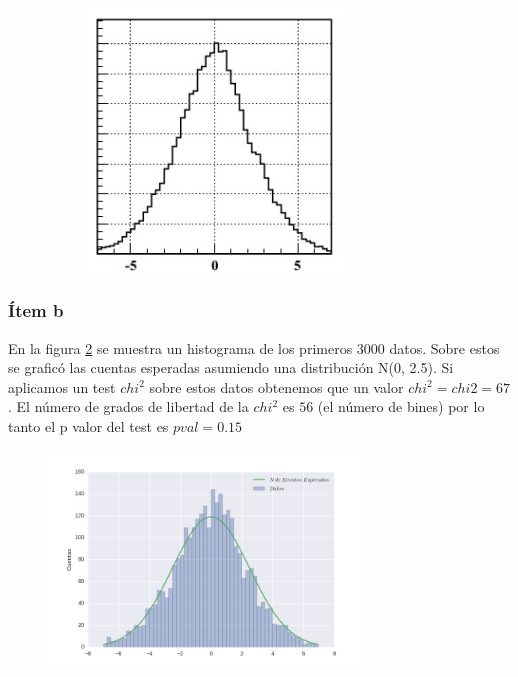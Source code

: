 \begin{figure}
\begin{subfigure}[b]{0.3\textwidth}
\includegraphics[width=0.75\textwidth]{hist1.jpg}
\end{subfigure}
\caption[]{}
\label{fig:hists}
\end{figure}

\subsubsection*{Ítem b}
En la figura \ref{fig:fig2} se muestra un histograma de los primeros $3000$ datos.
Sobre estos se graficó las cuentas esperadas asumiendo una distribución N(0, 2.5).
Si aplicamos un test $chi^2$ sobre estos datos obtenemos que un valor $chi^2 =chi2=67$.
El número de grados de libertad de la $chi^2$ es $56$ (el número de bines) por lo tanto el p valor del test es $pval=0.15$

\begin{figure}
\centering
\includegraphics[width=0.75\textwidth]{fig2.jpg}
\caption[]{}
\label{fig:fig2}
\end{figure}
